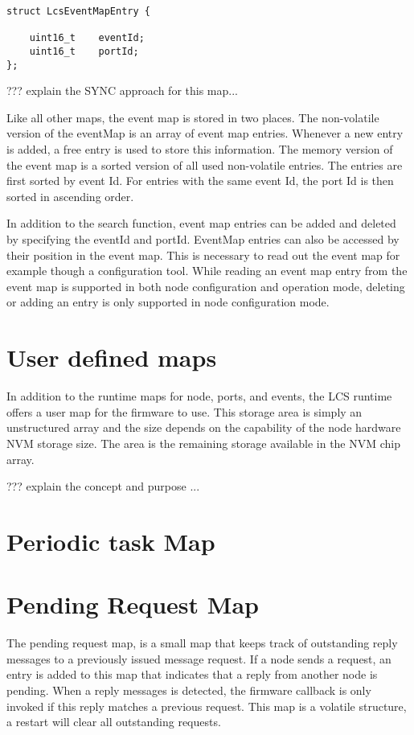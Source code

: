 \lstset{style=listingstyle}
\begin{lstlisting}
struct LcsEventMapEntry {

    uint16_t	eventId;
    uint16_t 	portId;
};
\end{lstlisting}

??? explain the SYNC approach for this map...

Like all other maps, the event map is stored in two places. The non-volatile version of the eventMap is an array of event map entries. Whenever a new entry is added, a free entry is used to store this information. The memory version of the event map is a sorted version of all used non-volatile entries. The entries are first sorted by event Id. For entries with the same event Id, the port Id is then sorted in ascending order.

In addition to the search function, event map entries can be added and deleted by specifying the eventId and portId. EventMap entries can also be accessed by their position in the event map. This is necessary to read out the event map for example though a configuration tool. While reading an event map entry from the event map is supported in both node configuration and operation mode, deleting or adding an entry is only supported in node configuration mode.

\section{User defined maps}

In addition to the runtime maps for node, ports, and events, the LCS runtime offers a user map for the firmware to use. This storage area is simply an unstructured array and the size depends on the capability of the node hardware NVM storage size. The area is the remaining storage available in the NVM chip array.

 ??? explain the concept and purpose ...

 \section{Periodic task Map}


 \section{Pending Request Map}

The pending request map, is a small map that keeps track of outstanding reply messages to a previously issued message request. If a node sends a request, an entry is added to this map that indicates that a reply from another node is pending. When a reply messages is detected, the firmware callback is only invoked if this reply matches a previous request. This map is a volatile structure, a restart will clear all outstanding requests.

